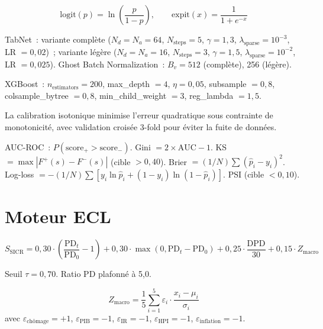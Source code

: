 \documentclass[10pt, a4paper, oneside]{report}
\theoremstyle{definition}
\begin{document}
\begin{equation}
\text{logit}(p) = \ln\!\left(\frac{p}{1-p}\right), \qquad \text{expit}(x) = \frac{1}{1 + e^{-x}}
\label{eq:logit-expit}
\end{equation}

TabNet~: variante complète ($N_d = N_a = 64$, $N_{\text{steps}} = 5$, $\gamma = 1{,}3$, $\lambda_{\text{sparse}} = 10^{-3}$, LR $= 0{,}02$)~; variante légère ($N_d = N_a = 16$, $N_{\text{steps}} = 3$, $\gamma = 1{,}5$, $\lambda_{\text{sparse}} = 10^{-2}$, LR $= 0{,}025$). Ghost Batch Normalization~: $B_v = 512$ (complète), 256 (légère).

XGBoost~: $n_{\text{estimators}} = 200$, max\_depth $= 4$, $\eta = 0{,}05$, subsample $= 0{,}8$, colsample\_bytree $= 0{,}8$, min\_child\_weight $= 3$, reg\_lambda $= 1{,}5$.

La calibration isotonique minimise l'erreur quadratique sous contrainte de monotonicité, avec validation croisée 3-fold pour éviter la fuite de données.

AUC-ROC~: $P(\text{score}_+ > \text{score}_-)$. Gini $= 2 \times \text{AUC} - 1$. KS $= \max|F^+(s) - F^-(s)|$ (cible $> 0{,}40$). Brier $= (1/N)\sum(\hat{p}_i - y_i)^2$. Log-loss $= -(1/N)\sum[y_i \ln \hat{p}_i + (1 - y_i) \ln(1 - \hat{p}_i)]$. PSI (cible $< 0{,}10$).


\section{Moteur ECL}
\label{sec:annexe:ecl}

\begin{equation}
S_{\text{SICR}} = 0{,}30 \cdot \left(\frac{\text{PD}_t}{\text{PD}_0} - 1\right) + 0{,}30 \cdot \max(0, \text{PD}_t - \text{PD}_0) + 0{,}25 \cdot \frac{\text{DPD}}{30} + 0{,}15 \cdot Z_{\text{macro}}
\label{eq:sicr}
\end{equation}

Seuil $\tau = 0{,}70$. Ratio PD plafonné à 5{,}0.

\begin{equation}
Z_{\text{macro}} = \frac{1}{5} \sum_{i=1}^{5} \varepsilon_i \cdot \frac{x_i - \mu_i}{\sigma_i}
\label{eq:z-macro}
\end{equation}
avec $\varepsilon_{\text{chômage}} = +1$, $\varepsilon_{\text{PIB}} = -1$, $\varepsilon_{\text{IR}} = -1$, $\varepsilon_{\text{HPI}} = -1$, $\varepsilon_{\text{inflation}} = -1$.
\end{document}
